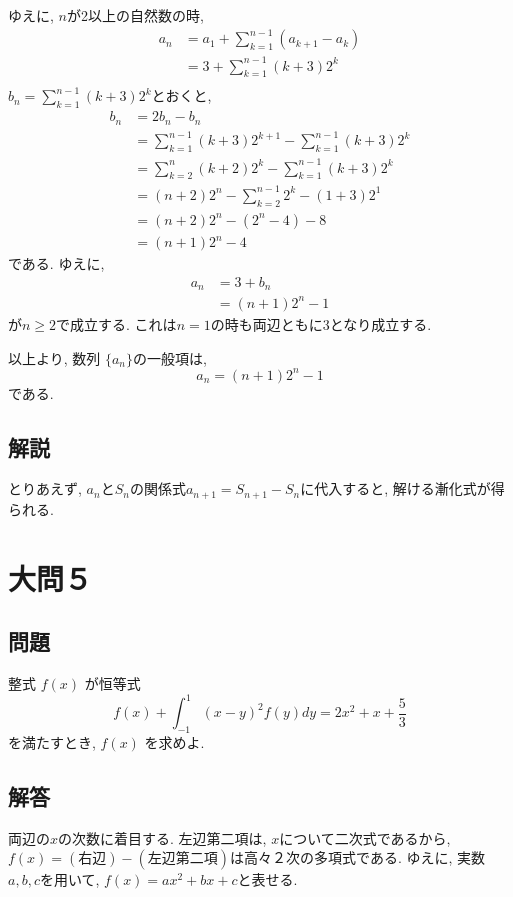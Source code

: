 \documentclass[dvipdfmx,a4paper]{jsarticle}
\begin{document}
    ゆえに, $n$が2以上の自然数の時, 
    \begin{align*}
        a_n &= a_1 + \sum_{k=1}^{n-1} (a_{k+1} - a_k) \\
        &= 3 + \sum_{k=1}^{n-1} (k+3)2^k \\
    \end{align*}
    $\displaystyle b_n = \sum_{k=1}^{n-1} (k+3)2^k$とおくと, 
    \begin{align*}
        b_n &= 2b_n - b_n \\
        &= \sum_{k=1}^{n-1} (k+3)2^{k+1} - \sum_{k=1}^{n-1} (k+3)2^k \\
        &= \sum_{k=2}^{n} (k+2)2^{k} - \sum_{k=1}^{n-1} (k+3)2^k \\
        &= (n+2)2^n - \sum_{k=2}^{n-1} 2^{k} - (1+3)2^1 \\
        &= (n+2)2^n - (2^n-4) - 8 \\
        &= (n+1)2^n -4
    \end{align*}
    である. ゆえに, 
    \begin{align*}
        a_n &= 3 + b_n \\
        &= (n+1)2^n -1
    \end{align*}
    が$n \geq 2$で成立する. これは$n=1$の時も両辺ともに3となり成立する. 

    以上より, 数列 $\{a_n\}$の一般項は, 
    \begin{equation*}
        a_n= (n+1)2^n -1
    \end{equation*}
    である. 

    \subsection{解説}
    とりあえず, $a_n$と$S_n$の関係式$a_{n+1} = S_{n+1} - S_n$に代入すると, 
    解ける漸化式が得られる. 

    \section{大問５}
    \subsection{問題}
    整式 $f(x)$ が恒等式
    \begin{equation*}
        f(x) + \int_{-1}^1 (x-y)^2 f(y) dy = 2x^2 + x + \frac{5}{3}
    \end{equation*}
    を満たすとき, $f(x)$ を求めよ. 

    \subsection{解答}
    両辺の$x$の次数に着目する. 左辺第二項は, $x$について二次式であるから, 
    $f(x) = \mathrm{(右辺)} - \mathrm{(左辺第二項)}$は高々２次の多項式である. 
    ゆえに, 実数$a,b,c$を用いて, $f(x) = ax^2 + bx + c$と表せる. 
\end{document}
